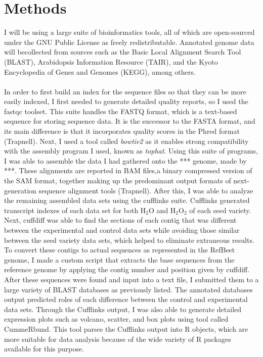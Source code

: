 \documentclass{article}
\begin{document}
\section{Methods}
	I will be using a large suite of bioinformatics tools, all of which are open-sourced under the GNU Public License as freely redistributable. Annotated genome data will becollected from sources such as the Basic Local Alignment Search Tool (BLAST), Arabidopsis Information Resource (TAIR), and the Kyoto Encyclopedia of Genes and Genomes (KEGG), among others.\\\\
	In order to first build an index for the sequence files so that they can be more easily indexed, I first needed to generate detailed quality reports, so I used the fastqc toolset. This suite handles the FASTQ format, which is a text-based sequence for storing sequence data. It is the successor to the FASTA format, and its main difference is that it incorporates quality scores in the Phred format (Trapnell). Next, I used a tool called \emph{bowtie2} as it enables strong compatibility with the assembly program I used, known as \emph{tophat}. Using this suite of programs, I was able to assemble the data I had gathered onto the *** genome, made by ***. These alignments are reported in BAM files,a binary compressed version of the SAM format, together making up the predominant output formats of next-generation sequence alignment tools (Trapnell). After this, I was able to analyze the remaining assembled data sets using the cufflinks suite. Cufflinks generated transcript indexes of each data set for both H$_{2}$O and H$_{2}$O$_{2}$ of each seed variety. Next, cuffdiff was able to find the sections of each contig that was different between the experimental and control data sets while avoiding those similar between the seed variety data sets, which helped to eliminate extraneous results. To convert these contigs to actual sequences as represented in the RefBeet genome, I made a custom script that extracts the base sequences from the reference genome by applying the contig number and position given by cuffdiff. After these sequences were found and input into a text file, I submitted them to a large variety of BLAST databases as previously listed. The annotated databases output predicted roles of each difference between the control and experimental data sets. Through the Cufflinks output, I was also able to generate detailed expression plots such as volcano, scatter, and box plots using tool called CummeRbund. This tool parses the Cufflinks output into R objects, which are more suitable for data analysis because of the wide variety of R packages available for this purpose.
\end{document}

